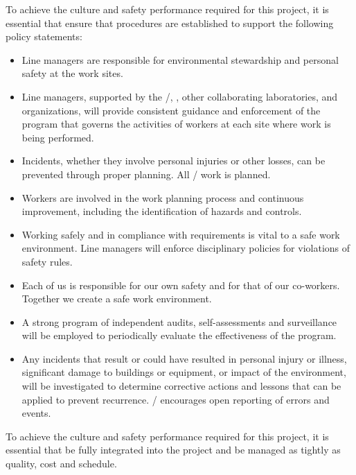 To achieve the culture and safety performance required for this
project, it is essential that  ensure that procedures
are established to support the following  policy
statements:
\begin{itemize}
  \item Line managers are responsible for environmental stewardship
    and personal safety at the  work sites.
  \item Line managers, supported by the /,
    \fnal, other collaborating laboratories, and \surf {}
    organizations, will provide consistent guidance and enforcement of
    the  program that governs the activities of workers at each
    site where work is being performed.
  \item Incidents, whether they involve personal injuries or other
    losses, can be prevented through proper planning. All
    / work is planned.
  \item Workers are involved in the work planning process and
    continuous improvement, including the identification of hazards
    and controls.
  \item Working safely and in compliance with requirements is vital to
    a safe work environment. Line managers will enforce disciplinary
    policies for violations of safety rules.
  \item Each of us is responsible for  our own safety and for that of
    our co-workers. Together we create a safe work environment.
  \item A strong program of independent audits, self-assessments and
    surveillance will be employed to periodically evaluate the
    effectiveness of the  program.
  \item Any incidents that result or could have resulted in personal
    injury or illness, significant damage to buildings or equipment,
    or impact of the environment, will be investigated to determine
    corrective actions and lessons that can be applied to prevent
    recurrence. / encourages open reporting of
    errors and events.
\end{itemize}

To achieve the culture and safety performance required for this
project, it is essential that  be fully integrated into the
project and be managed as tightly as quality, cost and schedule.
